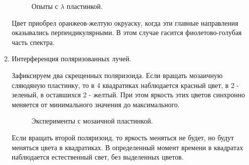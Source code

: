 \documentclass[a4paper,12pt]{article}
\theoremstyle{plain} %
\theoremstyle{definition} %
\theoremstyle{remark} %
\begin{document}
\begin{enumerate}
	\begin{figure}[h!]
		\caption{Опыты с $\lambda$ пластинкой.}
	\end{figure}
	
	
	Цвет приобрел оранжеов-желтую окруаску, когда эти главные направления оказывались перпендикулярными. В этом случае гасится фиолетово-голубая часть спектра.
	
	\item Интерференция поляризованных лучей.
	
	Зафиксируем два скрещенных поляризоида. Если вращать мозаичную сляюдяную пластинку, то в 4 квадратиках наблюдается красный цвет, в 2 - зеленый, в оставшихся 2 - желтый. При этом яркость этих цветов синхронно меняется от минимального значения до максимального.
	
	\begin{figure}[h!]
		\caption{Эксперименты с мозаичной пластинкой.}
	\end{figure}

	Если вращать второй поляризоид, то яркость меняться не будет, но будут меняться цвета в квадратиках. В определенный момент времени в квадратах наблюдается естественный свет, без выделенных цветов.
	
	
\end{enumerate}
\end{document}
